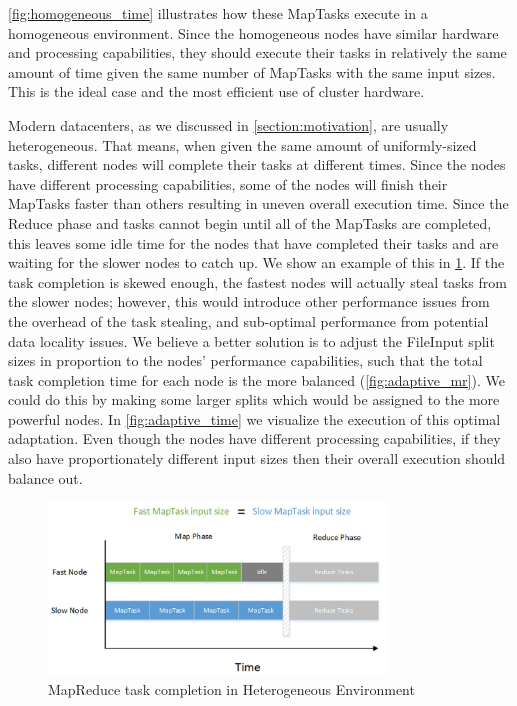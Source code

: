 \ref{fig:homogeneous_time} illustrates how these MapTasks execute in a homogeneous environment. Since the homogeneous nodes have
similar hardware and processing capabilities, they should execute their tasks in relatively the same amount of
time given the same number of MapTasks with the same input sizes. This is the ideal case and the most efficient use of cluster hardware.


Modern datacenters, as we discussed in \ref{section:motivation}, are usually heterogeneous. That means,
when given the same amount of uniformly-sized tasks, different nodes will complete their tasks
at different times. Since the nodes
have different processing capabilities, some of the nodes will finish their MapTasks faster than others
resulting in uneven overall execution time. Since the Reduce phase and tasks cannot begin until all of
the MapTasks are completed, this leaves some idle time for the nodes that have completed their tasks and
are waiting for the slower nodes to catch up. We show an example of this in \ref{fig:heterogeneous_time}.
If the task completion
is skewed enough, the fastest nodes will actually steal tasks from the slower nodes; however,
this would introduce other performance issues from the overhead of the task stealing, and
sub-optimal performance from potential data locality issues. We believe a better solution is to
adjust the FileInput split sizes in proportion to the nodes' performance capabilities, such that
the total task completion time for each node is the more balanced (\ref{fig:adaptive_mr}). We could do this by making some larger
splits which would be assigned to the more powerful nodes. In \ref{fig:adaptive_time} we visualize the execution of
this optimal adaptation. Even though the nodes have different processing
capabilities, if they also have proportionately different input sizes then their overall execution should balance out.

\begin{figure}[ht!]
\centering
\includegraphics[width=90mm]{heterogeneous_time.jpg}
\caption{MapReduce task completion in Heterogeneous Environment}
\label{fig:heterogeneous_time}
\end{figure}

